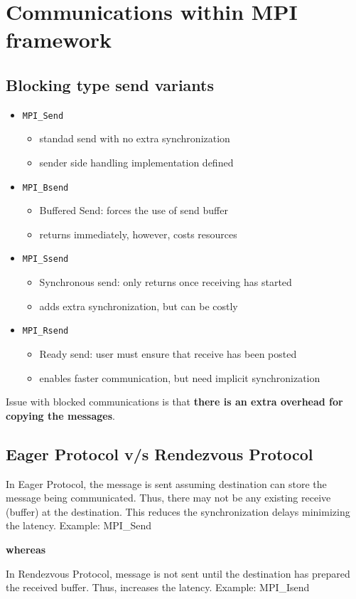 \documentclass[12pt, a4paper]{report}
\begin{document}
\section{Communications within MPI framework}
\subsection{Blocking type send variants}
\begin{itemize}
\item \verb$MPI_Send$
    \begin{itemize}
        \item standad send with no extra synchronization
        \item sender side handling implementation defined
    \end{itemize}
\item \verb$MPI_Bsend$
    \begin{itemize}
        \item Buffered Send: forces the use of send buffer
        \item returns immediately, however, costs resources
    \end{itemize}
\item \verb$MPI_Ssend$
    \begin{itemize}
        \item Synchronous send: only returns once receiving has started
        \item adds extra synchronization, but can be costly
    \end{itemize}
\item \verb$MPI_Rsend$
    \begin{itemize}
        \item Ready send: user must ensure that receive has been posted
        \item enables faster communication, but need implicit synchronization
    \end{itemize}
\end{itemize}
Issue with blocked communications is that {\bfseries{there is an extra overhead for copying the messages}}.

\subsection{Eager Protocol v/s Rendezvous Protocol}
In Eager Protocol, the message is sent assuming destination can store the message being communicated. Thus, there may not
be any existing receive (buffer) at the destination. This reduces the synchronization delays minimizing the latency. Example:
MPI\_Send
\begin{center}
    {\bfseries whereas}
\end{center}
In Rendezvous Protocol, message is not sent until the destination has prepared the received buffer. Thus, increases the 
latency. Example: MPI\_Isend
\end{document}
